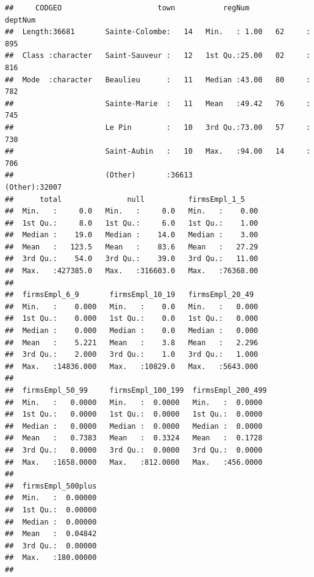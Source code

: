\documentclass[]{article}
\newenvironment{Shaded}{\begin{snugshade}}{\end{snugshade}}
\newcommand{\KeywordTok}[1]{\textcolor[rgb]{0.13,0.29,0.53}{\textbf{#1}}}
\newcommand{\StringTok}[1]{\textcolor[rgb]{0.31,0.60,0.02}{#1}}
\newcommand{\CommentTok}[1]{\textcolor[rgb]{0.56,0.35,0.01}{\textit{#1}}}
\newcommand{\OperatorTok}[1]{\textcolor[rgb]{0.81,0.36,0.00}{\textbf{#1}}}
\newcommand{\NormalTok}[1]{#1}
\begin{document}
\begin{verbatim}
##     CODGEO                      town           regNum         deptNum     
##  Length:36681       Sainte-Colombe:   14   Min.   : 1.00   62     :  895  
##  Class :character   Saint-Sauveur :   12   1st Qu.:25.00   02     :  816  
##  Mode  :character   Beaulieu      :   11   Median :43.00   80     :  782  
##                     Sainte-Marie  :   11   Mean   :49.42   76     :  745  
##                     Le Pin        :   10   3rd Qu.:73.00   57     :  730  
##                     Saint-Aubin   :   10   Max.   :94.00   14     :  706  
##                     (Other)       :36613                   (Other):32007  
##      total               null          firmsEmpl_1_5     
##  Min.   :     0.0   Min.   :     0.0   Min.   :    0.00  
##  1st Qu.:     8.0   1st Qu.:     6.0   1st Qu.:    1.00  
##  Median :    19.0   Median :    14.0   Median :    3.00  
##  Mean   :   123.5   Mean   :    83.6   Mean   :   27.29  
##  3rd Qu.:    54.0   3rd Qu.:    39.0   3rd Qu.:   11.00  
##  Max.   :427385.0   Max.   :316603.0   Max.   :76368.00  
##                                                          
##  firmsEmpl_6_9       firmsEmpl_10_19   firmsEmpl_20_49   
##  Min.   :    0.000   Min.   :    0.0   Min.   :   0.000  
##  1st Qu.:    0.000   1st Qu.:    0.0   1st Qu.:   0.000  
##  Median :    0.000   Median :    0.0   Median :   0.000  
##  Mean   :    5.221   Mean   :    3.8   Mean   :   2.296  
##  3rd Qu.:    2.000   3rd Qu.:    1.0   3rd Qu.:   1.000  
##  Max.   :14836.000   Max.   :10829.0   Max.   :5643.000  
##                                                          
##  firmsEmpl_50_99     firmsEmpl_100_199  firmsEmpl_200_499 
##  Min.   :   0.0000   Min.   :  0.0000   Min.   :  0.0000  
##  1st Qu.:   0.0000   1st Qu.:  0.0000   1st Qu.:  0.0000  
##  Median :   0.0000   Median :  0.0000   Median :  0.0000  
##  Mean   :   0.7383   Mean   :  0.3324   Mean   :  0.1728  
##  3rd Qu.:   0.0000   3rd Qu.:  0.0000   3rd Qu.:  0.0000  
##  Max.   :1658.0000   Max.   :812.0000   Max.   :456.0000  
##                                                           
##  firmsEmpl_500plus  
##  Min.   :  0.00000  
##  1st Qu.:  0.00000  
##  Median :  0.00000  
##  Mean   :  0.04842  
##  3rd Qu.:  0.00000  
##  Max.   :180.00000  
## 
\end{verbatim}

\begin{Shaded}
\end{Shaded}
\end{document}
